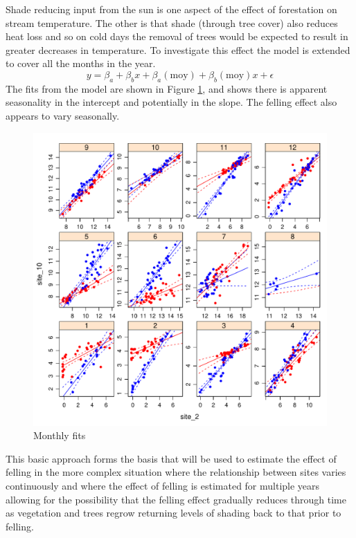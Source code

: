 Shade reducing input from the sun is one aspect of the effect of forestation on stream temperature.  The other is that shade (through tree cover) also reduces heat loss and so on cold days the removal of trees would be expected to result in greater decreases in temperature.  To investigate this effect the model is extended to cover all the months in the year.
\begin{equation}
  y = \beta_a + \beta_b x + \beta_a(\text{moy}) + \beta_b(\text{moy})x + \epsilon
\end{equation}
The fits from the model are shown in Figure \ref{fig:chptr4:monthlyfits}, and shows there is apparent seasonality in the intercept and potentially in the slope.  The felling effect also appears to vary seasonally.

\begin{figure}
  \centering
  \includegraphics[width=\textwidth]{simpleExample3plot-2}
\caption{Monthly fits}
\label{fig:chptr4:monthlyfits}
\end{figure}


This basic approach forms the basis that will be used to estimate the effect of felling in the more complex situation where the relationship between sites varies continuously and where the effect of felling is estimated for multiple years allowing for the possibility that the felling effect gradually reduces through time as vegetation and trees regrow returning levels of shading back to that prior to felling.


